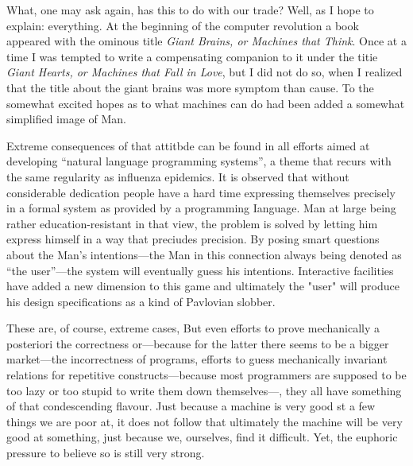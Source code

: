 \documentclass[10pt,letterpaper,twocolumn]{article}
\begin{document}
What, one may ask again, has this to do with 
our trade? Well, as I hope to explain: everything. 
At the beginning of the computer revolution a book 
appeared with the ominous title \textsl{Giant Brains, or 
Machines that Think}. Once at a time I was tempted 
to write a compensating companion to it under the 
titie \textsl{Giant Hearts, or Machines that Fall in Love}, 
but I did not do so, when I realized that the title 
about the giant brains was more symptom than cause. 
To the somewhat excited hopes as to what machines 
can do had been added a somewhat simplified image 
of Man. 

Extreme consequences of that attitbde can be found in all efforts aimed at
developing ``natural language programming systems'', a theme that recurs with
the same regularity as influenza epidemics. It is observed that without
considerable dedication people have a hard time expressing themselves precisely
in a formal system as provided by a programming Ianguage. Man at large being
rather education-resistant in that view, the problem is solved by letting him
express himself in a way that preciudes precision. By posing smart questions
about the Man's intentions---the Man in this connection always being denoted as
``the user''---the system will eventually guess his intentions. Interactive
facilities have added a new dimension to this game and ultimately the "user"
will produce his design specifications as a kind of Pavlovian slobber. 

These are, of course, extreme cases, But even efforts to prove mechanically a
posteriori the correctness or---because for the latter there seems to be a
bigger market---the incorrectness of programs, efforts to guess mechanically
invariant relations for repetitive constructs---because most programmers are
supposed to be too lazy or too stupid to write them down themselves---, they
all have something of that condescending flavour. Just because a machine is
very good st a few things we are poor at, it does not follow that ultimately
the machine will be very good at something, just because we, ourselves, find it
difficult. Yet, the euphoric pressure to believe so is still very strong. 
\end{document}
